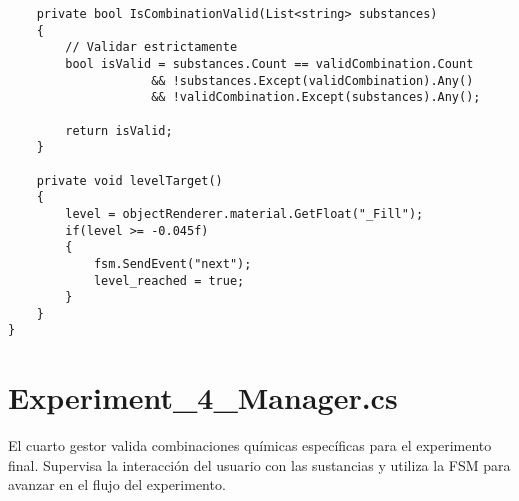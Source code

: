 \begin{verbatim}
    private bool IsCombinationValid(List<string> substances)
    {
        // Validar estrictamente
        bool isValid = substances.Count == validCombination.Count 
                    && !substances.Except(validCombination).Any() 
                    && !validCombination.Except(substances).Any();

        return isValid;
    }

    private void levelTarget()
    {
        level = objectRenderer.material.GetFloat("_Fill");
        if(level >= -0.045f)
        {
            fsm.SendEvent("next");
            level_reached = true;
        }
    }
}
\end{verbatim}
\newpage
\section{Experiment\_4\_Manager.cs}\label{script:Experiment4Manager}
El cuarto gestor valida combinaciones químicas específicas para el experimento final. Supervisa la interacción del usuario con las sustancias y utiliza la FSM para avanzar en el flujo del experimento.
